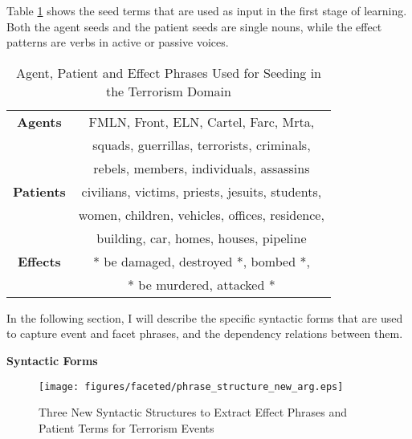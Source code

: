 Table \ref{seed-table-terrorism} shows the seed terms 
that are used as input in the first stage of learning.
Both the  agent seeds and the patient seeds are single nouns, while the effect 
patterns are verbs in active or passive voices.  

\begin{table}[htbp]
\small
\centering
\begin{tabular}[center]{|c|c|} \hline
{\bf Agents} & FMLN, Front, ELN, Cartel, Farc, Mrta,\\
             & squads, guerrillas, terrorists, criminals,\\
             & rebels, members, individuals, assassins\\ \hline 
{\bf Patients} & civilians, victims, priests, jesuits, students,\\
               & women, children, vehicles, offices, residence,\\
               & building, car, homes, houses, pipeline\\ \hline
{\bf Effects}	& * be damaged, destroyed *, bombed *,\\
	        & * be murdered, attacked * \\ \hline

\end{tabular}
\caption{Agent, Patient and Effect Phrases Used for Seeding in the Terrorism Domain}
\label{seed-table-terrorism}
\end{table}

In the following section, I will describe the specific syntactic forms  
that are used to capture 
event and facet phrases, 
and the dependency relations 
between them. 

\vspace{.1in}
{\bf Syntactic Forms}
\vspace{.1in}

\begin{figure}[htbp]
 \centering
 \texttt{[image: figures/faceted/phrase\_structure\_new\_arg.eps]}
 \caption{Three New Syntactic Structures to Extract Effect Phrases and Patient Terms for Terrorism Events}
\label{phrase-syntax-added}
\end{figure} 


